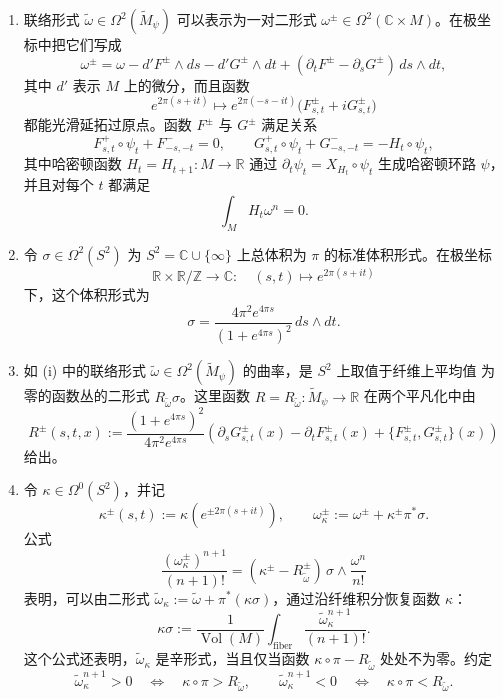 \begin{remark}\label{rem:8-2-11}
\begin{enumerate}[label=\textup{(\roman*)},leftmargin=3em]
\item {}联络形式 $\widetilde\omega\in\Omega^2(\widetilde M_\psi)$ 可以表示为一对二形式
$\omega^\pm\in\Omega^2(\mathbb C\times M)$。在极坐标中把它们写成
\[
  \omega^\pm
  =\omega-d'F^\pm\wedge ds-d'G^\pm\wedge dt
   +(\partial_tF^\pm-\partial_sG^\pm)\,ds\wedge dt,
\]
其中 $d'$ 表示 $M$ 上的微分，而且函数
\[
  e^{2\pi(s+it)}\longmapsto
  e^{2\pi(-s-it)}\bigl(F^\pm_{s,t}+iG^\pm_{s,t}\bigr)
\]
都能光滑延拓过原点。函数 $F^\pm$ 与 $G^\pm$ 满足关系
\[
  F^+_{s,t}\circ\psi_t+F^-_{-s,-t}=0,
  \qquad
  G^+_{s,t}\circ\psi_t+G^-_{-s,-t}=-H_t\circ\psi_t,
\]
其中哈密顿函数 $H_t=H_{t+1}:M\to\mathbb R$ 通过
$\partial_t\psi_t=X_{H_t}\circ\psi_t$ 生成哈密顿环路 $\psi$，并且对每个 $t$ 都满足
\[
  \int_MH_t\omega^n=0.
\]

\item 令 $\sigma\in\Omega^2(S^2)$ 为 $S^2=\mathbb C\cup\{\infty\}$ 上总体积为
$\pi$ 的标准体积形式。在极坐标
\[
  \mathbb R\times\mathbb R/\mathbb Z\longrightarrow\mathbb C:\quad
  (s,t)\longmapsto e^{2\pi(s+it)}
\]
下，这个体积形式为
\[
  \sigma=\frac{4\pi^2e^{4\pi s}}{(1+e^{4\pi s})^2}\,ds\wedge dt.
\]

\item 如 (i) 中的联络形式
$\widetilde\omega\in\Omega^2(\widetilde M_\psi)$ 的曲率，是 $S^2$ 上取值于纤维上平均值
为零的函数丛的二形式 $R_{\widetilde\omega}\sigma$。这里函数
$R=R_{\widetilde\omega}:\widetilde M_\psi\to\mathbb R$ 在两个平凡化中由
\[
  R^\pm(s,t,x)
  :=\frac{(1+e^{4\pi s})^2}{4\pi^2e^{4\pi s}}
  \left(
    \partial_sG^\pm_{s,t}(x)-\partial_tF^\pm_{s,t}(x)
    +\{F^\pm_{s,t},G^\pm_{s,t}\}(x)
  \right)
\]
给出。

\item 令 $\kappa\in\Omega^0(S^2)$，并记
\[
  \kappa^\pm(s,t):=\kappa(e^{\pm2\pi(s+it)}),
  \qquad
  \omega^\pm_\kappa:=\omega^\pm+\kappa^\pm\pi^*\sigma.
\]
公式
\[
  \frac{(\omega^\pm_\kappa)^{n+1}}{(n+1)!}
  =(\kappa^\pm-R^\pm_{\widetilde\omega})\,
    \sigma\wedge\frac{\omega^n}{n!}
\]
表明，可以由二形式
$\widetilde\omega_\kappa:=\widetilde\omega+\pi^*(\kappa\sigma)$，通过沿纤维积分恢复函数
$\kappa$：
\[
  \kappa\sigma
  :=\frac1{\operatorname{Vol}(M)}
    \int_{\mathrm{fiber}}
    \frac{\widetilde\omega_\kappa^{n+1}}{(n+1)!}.
\]
这个公式还表明，$\widetilde\omega_\kappa$ 是辛形式，当且仅当函数
$\kappa\circ\pi-R_{\widetilde\omega}$ 处处不为零。约定
\[
  \widetilde\omega_\kappa^{n+1}>0
  \quad\Longleftrightarrow\quad
  \kappa\circ\pi>R_{\widetilde\omega},
  \qquad
  \widetilde\omega_\kappa^{n+1}<0
  \quad\Longleftrightarrow\quad
  \kappa\circ\pi<R_{\widetilde\omega}.
\]
\end{enumerate}
\end{remark}
